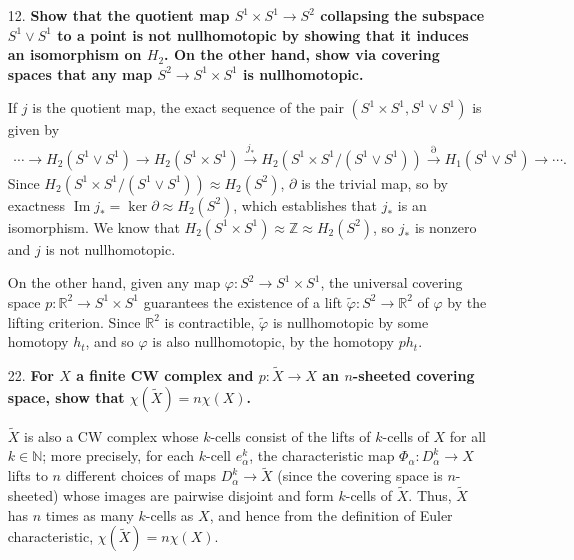 \documentclass[a4paper,12pt]{article}
\DeclareMathOperator{\im}{Im}
\begin{document}
\begin{enumerate}
    \item[12.]
        \boldmath\textbf{Show that the quotient map $S^1 \times S^1 \to S^2$ collapsing the subspace $S^1 \lor S^1$ to a point is not nullhomotopic by showing that it induces an isomorphism on $H_2$. On the other hand, show via covering spaces that any map $S^2 \to S^1 \times S^1$ is nullhomotopic.
        }\unboldmath \par
        If $j$ is the quotient map, the exact sequence of the pair $(S^1 \times S^1, S^1 \vee S^1)$ is given by
        \begin{align*}
            \cdots \rightarrow H_2(S^1 \vee S^1) \rightarrow H_2(S^1 \times S^1) \xrightarrow{j_*} H_2(S^1 \times S^1 / (S^1 \vee S^1)) \xrightarrow{\partial} H_1(S^1 \vee S^1) \rightarrow \cdots.
        \end{align*}
        Since $H_2(S^1 \times S^1 / (S^1 \vee S^1)) \approx H_2(S^2)$, $\partial$ is the trivial map, so by exactness $\im j_* = \ker \partial \approx H_2(S^2)$, which establishes that $j_*$ is an isomorphism. We know that $H_2(S^1 \times S^1) \approx \mathbb{Z} \approx H_2(S^2)$, so $j_*$ is nonzero and $j$ is not nullhomotopic. \par
        On the other hand, given any map $\varphi : S^2 \to S^1 \times S^1$, the universal covering space $p : \mathbb{R}^2 \to S^1 \times S^1$ guarantees the existence of a lift $\tilde{\varphi} : S^2 \to \mathbb{R}^2$ of $\varphi$ by the lifting criterion. Since $\mathbb{R}^2$ is contractible, $\tilde{\varphi}$ is nullhomotopic by some homotopy $h_t$, and so $\varphi$ is also nullhomotopic, by the homotopy $ph_t$.

    \item[22.]
        \boldmath\textbf{For $X$ a finite CW complex and $p : \tilde{X} \to X$ an $n$-sheeted covering space, show that $\chi(\tilde{X}) = n\chi(X)$.
        }\unboldmath \par
        $\tilde{X}$ is also a CW complex whose $k$-cells consist of the lifts of $k$-cells of $X$ for all $k \in \mathbb{N}$; more precisely, for each $k$-cell $e_\alpha^k$, the characteristic map $\Phi_\alpha : D_\alpha^k \to X$ lifts to $n$ different choices of maps $D_\alpha^k \to \tilde{X}$ (since the covering space is $n$-sheeted) whose images are pairwise disjoint and form $k$-cells of $\tilde{X}$. Thus, $\tilde{X}$ has $n$ times as many $k$-cells as $X$, and hence from the definition of Euler characteristic, $\chi(\tilde{X}) = n\chi(X)$.


\end{enumerate}
\end{document}
